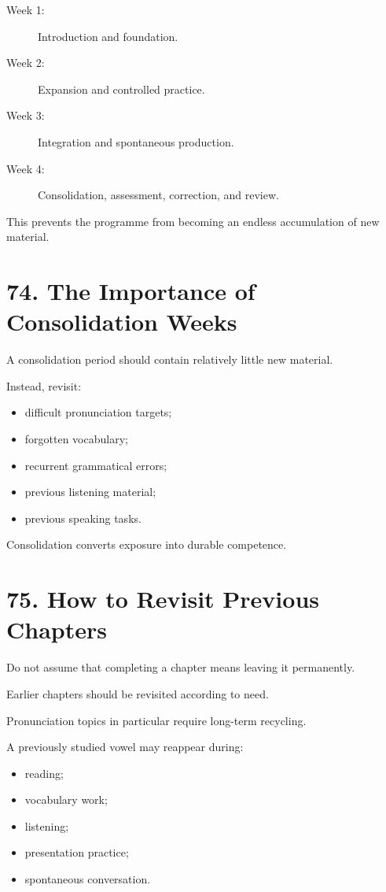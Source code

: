 \begin{description}
    \item[Week 1:] Introduction and foundation.
    \item[Week 2:] Expansion and controlled practice.
    \item[Week 3:] Integration and spontaneous production.
    \item[Week 4:] Consolidation, assessment, correction, and review.
\end{description}

This prevents the programme from becoming an endless accumulation of new material.

\section*{74. The Importance of Consolidation Weeks}

A consolidation period should contain relatively little new material.

Instead, revisit:

\begin{itemize}
    \item difficult pronunciation targets;
    \item forgotten vocabulary;
    \item recurrent grammatical errors;
    \item previous listening material;
    \item previous speaking tasks.
\end{itemize}

Consolidation converts exposure into durable competence.

\section*{75. How to Revisit Previous Chapters}

Do not assume that completing a chapter means leaving it permanently.

Earlier chapters should be revisited according to need.

Pronunciation topics in particular require long-term recycling.

A previously studied vowel may reappear during:

\begin{itemize}
    \item reading;
    \item vocabulary work;
    \item listening;
    \item presentation practice;
    \item spontaneous conversation.
\end{itemize}

